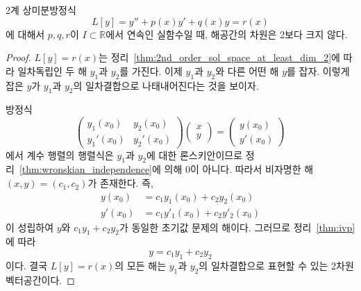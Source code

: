 \documentclass[../engineering_mathematics_lecture_note.tex]{subfiles}
\begin{document}
\begin{theorem}
    2계 상미분방정식
    \begin{equation*}
        L[y] = y'' + p(x) y' + q(x) y = r(x)
    \end{equation*}
    에 대해서
    $p, q, r$이 $I \subset \mathbb R$에서 연속인 실함수일 때, 해공간의 차원은 2보다 크지 않다.
\end{theorem}

\begin{proof}
    $L[y] = r(x)$는 정리~\ref{thm:2nd_order_sol_space_at_least_dim_2}에 따라 일차독립인 두 해 $y_1$과 $y_2$를 가진다.
    이제 $y_1$과 $y_2$와 다른 어떤 해 $y$를 잡자.
    이렇게 잡은 $y$가 $y_1$과 $y_2$의 일차결합으로 나태내어진다는 것을 보이자.

    방정식
    \begin{equation*}
        \begin{pmatrix}
            y_1(x_0) & y_2(x_0)\\
            y_1'(x_0) & y_2'(x_0)
        \end{pmatrix} \begin{pmatrix}
            x \\ y
        \end{pmatrix}
        = \begin{pmatrix}
            y(x_0) \\ y'(x_0)
        \end{pmatrix}
    \end{equation*}
    에서 계수 행렬의 행렬식은 $y_1$과 $y_2$에 대한 론스키안이므로 정리~\ref{thm:wronskian_independence}에 의해 0이 아니다.
    따라서 비자명한 해 $(x, y) = (c_1, c_2)$가 존재한다.
    즉,
    \begin{align*}
        y(x_0) &= c_1 y_1(x_0) + c_2 y_2(x_0)\\
        y'(x_0) &= c_1 y'_1(x_0) + c_2 y'_2(x_0)
    \end{align*}
    이 성립하여 $y$와 $c_1 y_1 + c_2 y_2$가 동일한 초기값 문제의 해이다.
    그러므로 정리~\ref{thm:ivp}에 따라
    \begin{equation*}
        y = c_1 y_1 + c_2 y_2
    \end{equation*}
    이다.
    결국 $L[y] = r(x)$의 모든 해는 $y_1$과 $y_2$의 일차결합으로 표현할 수 있는 2차원 벡터공간이다.
\end{proof}
\end{document}
